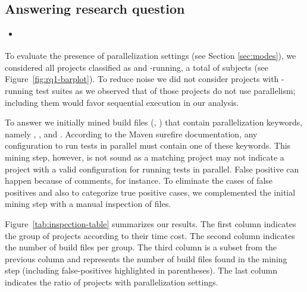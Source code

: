 \subsection{Answering research question \numRQC{}}
\label{sec:rqC}

\begin{itemize}
    \item \emph{\RQC}
\end{itemize}

To evaluate the presence of parallelization settings (see Section
\ref{sec:modes}), we considered all projects classified as \medg{} and
\longg{}-running, a total of \numMedLong{} subjects (see
Figure~\ref{fig:rq1-barplot}). To reduce noise we did not consider
projects with \shortg{}-running test suites as we observed that
\percentShortSequential{} of those projects do not use parallelism;
including them would favor sequential execution in our analysis.

To answer \numRQC{} we initially mined build files (\ie, \pomf{}) that
contain parallelization keywords, namely ,
, and .  According to the Maven
surefire documentation, any configuration to
run tests in parallel must contain one of these keywords. This mining
step, however, is not sound as a matching project may not indicate a
project with a valid configuration for running tests in parallel.
False positive can happen because of comments, for instance.  
To eliminate the cases of false positives and also to categorize true
positive cases, we complemented the initial mining step with a manual
inspection of files.



Figure~\ref{tab:inspection-table} summarizes our results. The first
column indicates the group of projects according to their time cost.
The second column indicates the number of build files per group.  The
third column is a subset from the previous column and represents the
number of build files found in the mining step (including
false-positives highlighted in parentheses). The last column indicates
the ratio of projects with parallelization settings.

